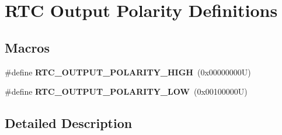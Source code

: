 \hypertarget{group___r_t_c___output___polarity___definitions}{}\section{R\+TC Output Polarity Definitions}
\label{group___r_t_c___output___polarity___definitions}
\subsection*{Macros}
\begin{DoxyCompactItemize}
\item 
\mbox{\label{group___r_t_c___output___polarity___definitions_ga093c938e6067080b264878bc99a43dd5}} 
\#define {\bfseries R\+T\+C\+\_\+\+O\+U\+T\+P\+U\+T\+\_\+\+P\+O\+L\+A\+R\+I\+T\+Y\+\_\+\+H\+I\+GH}~(0x00000000\+U)
\item 
\mbox{\label{group___r_t_c___output___polarity___definitions_ga97a5745b07442aa338c2a3b81c93048b}} 
\#define {\bfseries R\+T\+C\+\_\+\+O\+U\+T\+P\+U\+T\+\_\+\+P\+O\+L\+A\+R\+I\+T\+Y\+\_\+\+L\+OW}~(0x00100000\+U)
\end{DoxyCompactItemize}


\subsection{Detailed Description}
